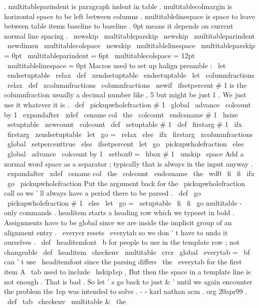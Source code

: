 {{{.
%
multitableparindent
is
paragraph
indent
in
table
.
%
multitablecolmargin
is
horizontal
space
to
be
left
between
columns
.
%
multitablelinespace
is
space
to
leave
between
table
items
baseline
%
to
baseline
.
%
0pt
means
it
depends
on
current
normal
line
spacing
.
%
\
newskip
\
multitableparskip
\
newskip
\
multitableparindent
\
newdimen
\
multitablecolspace
\
newskip
\
multitablelinespace
\
multitableparskip
=
0pt
\
multitableparindent
=
6pt
\
multitablecolspace
=
12pt
\
multitablelinespace
=
0pt
%
Macros
used
to
set
up
halign
preamble
:
%
\
let
\
endsetuptable
\
relax
\
def
\
xendsetuptable
{
\
endsetuptable
}
\
let
\
columnfractions
\
relax
\
def
\
xcolumnfractions
{
\
columnfractions
}
\
newif
\
ifsetpercent
%
#
1
is
the
columnfraction
usually
a
decimal
number
like
.
5
but
might
%
be
just
1
.
We
just
use
it
whatever
it
is
.
%
\
def
\
pickupwholefraction
#
1
{
%
\
global
\
advance
\
colcount
by
1
\
expandafter
\
xdef
\
csname
col
\
the
\
colcount
\
endcsname
{
#
1
\
hsize
}
%
\
setuptable
}
\
newcount
\
colcount
\
def
\
setuptable
#
1
{
%
\
def
\
firstarg
{
#
1
}
%
\
ifx
\
firstarg
\
xendsetuptable
\
let
\
go
=
\
relax
\
else
\
ifx
\
firstarg
\
xcolumnfractions
\
global
\
setpercenttrue
\
else
\
ifsetpercent
\
let
\
go
\
pickupwholefraction
\
else
\
global
\
advance
\
colcount
by
1
\
setbox0
=
\
hbox
{
#
1
\
unskip
\
space
}
%
Add
a
normal
word
space
as
a
%
separator
;
typically
that
is
always
in
the
input
anyway
.
\
expandafter
\
xdef
\
csname
col
\
the
\
colcount
\
endcsname
{
\
the
\
wd0
}
%
\
fi
\
fi
\
ifx
\
go
\
pickupwholefraction
%
Put
the
argument
back
for
the
\
pickupwholefraction
call
so
%
we
'
ll
always
have
a
period
there
to
be
parsed
.
\
def
\
go
{
\
pickupwholefraction
#
1
}
%
\
else
\
let
\
go
=
\
setuptable
\
fi
%
\
fi
\
go
}
%
multitable
-
only
commands
.
%
%
headitem
starts
a
heading
row
which
we
typeset
in
bold
.
%
Assignments
have
to
be
global
since
we
are
inside
the
implicit
group
%
of
an
alignment
entry
.
\
everycr
resets
\
everytab
so
we
don
'
t
have
to
%
undo
it
ourselves
.
\
def
\
headitemfont
{
\
b
}
%
for
people
to
use
in
the
template
row
;
not
changeable
\
def
\
headitem
{
%
\
checkenv
\
multitable
\
crcr
\
global
\
everytab
=
{
\
bf
}
%
can
'
t
use
\
headitemfont
since
the
parsing
differs
\
the
\
everytab
%
for
the
first
item
}
%
%
%
A
\
tab
used
to
include
\
hskip1sp
.
But
then
the
space
in
a
template
%
line
is
not
enough
.
That
is
bad
.
So
let
'
s
go
back
to
just
&
'
until
%
we
again
encounter
the
problem
the
1sp
was
intended
to
solve
.
%
-
-
karl
nathan
acm
.
org
20apr99
.
\
def
\
tab
{
\
checkenv
\
multitable
&
\
the
}}}}
